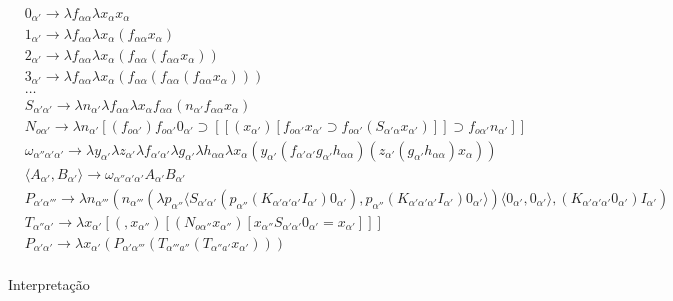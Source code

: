 \documentclass[../main.tex]{subfiles}
\begin{document}
\begin{align*}
    & 0_{\alpha'} \to \lambda f_{\alpha \alpha} \lambda x_{\alpha} x_{\alpha} \\
    & 1_{\alpha'} \to \lambda f_{\alpha \alpha} \lambda x_{\alpha} (f_{\alpha\alpha}x_{\alpha}) \\
    & 2_{\alpha'} \to \lambda f_{\alpha \alpha} \lambda x_{\alpha} (f_{\alpha\alpha}(f_{\alpha\alpha}x_{\alpha})) \\
    & 3_{\alpha'} \to \lambda f_{\alpha \alpha} \lambda x_{\alpha} (f_{\alpha\alpha}(f_{\alpha\alpha}(f_{\alpha\alpha}x_{\alpha}))) \\
    & \dots \\
    & S_{\alpha'\alpha'} \to \lambda n_{\alpha'} \lambda f_{\alpha \alpha} \lambda x_{\alpha} f_{\alpha\alpha}(n_{\alpha'}f_{\alpha\alpha}x_{\alpha}) \\
    & N_{o \alpha'} \to \lambda n_{\alpha '}[(f_{o \alpha'}) f_{o \alpha'} 0_{\alpha'} \supset [[(x_{\alpha'})[f_{o \alpha'} x_{\alpha'} \supset f_{o \alpha'}(S_{\alpha' \alpha} x_{\alpha'})]] \supset f_{o \alpha'}n_{\alpha'}]] \\
    & \omega_{\alpha'' \alpha' \alpha'} \to \lambda y_{\alpha'} \lambda z_{\alpha'} \lambda f_{\alpha'\alpha'} \lambda g_{\alpha'} \lambda h_{\alpha\alpha} \lambda x_{\alpha} (y_{\alpha'} (f_{\alpha'\alpha'} g_{\alpha'} h_{\alpha\alpha})(z_{\alpha'}(g_{\alpha'}h_{\alpha\alpha})x_{\alpha})) \\
    & \langle A_{\alpha'}, B_{\alpha'} \rangle \to \omega_{\alpha'' \alpha' \alpha'} A_{\alpha'} B_{\alpha'} \\
    & P_{\alpha'\alpha'''} \to \lambda n_{\alpha'''} (n_{\alpha'''} (\lambda p_{\alpha''} \langle S_{\alpha' \alpha'} (p_{\alpha''}(K_{\alpha'\alpha'\alpha'}I_{\alpha'}) 0_{\alpha'}), p_{\alpha''}(K_{\alpha'\alpha'\alpha'}I_{\alpha'}) 0_{\alpha'} \rangle) \langle 0_{\alpha'}, 0_{\alpha'} \rangle, (K_{\alpha'\alpha'\alpha'}0_{\alpha'})I_{\alpha'}) \\
    & T_{\alpha''\alpha'} \to \lambda x_{\alpha'} [(, x_{\alpha''})[(N_{o \alpha''}x_{\alpha''})[x_{\alpha''}S_{\alpha'\alpha'}0_{\alpha'} = x_{\alpha'}]]]  \\
    & P_{\alpha'\alpha'} \to \lambda x_{\alpha'} (P_{\alpha'\alpha'''}(T_{\alpha'''a''}(T_{\alpha''a'}x_{\alpha'}))) \\
\end{align*}

Interpretação
\end{document}
